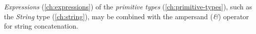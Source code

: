 \emph{Expressions} (\ref{ch:expressions}) of
the \emph{primitive types} (\ref{ch:primitive-types}),
such as the \emph{String} type (\ref{ch:string}),
may be combined with the ampersand (\emph{\&}) operator
for string concatenation.

